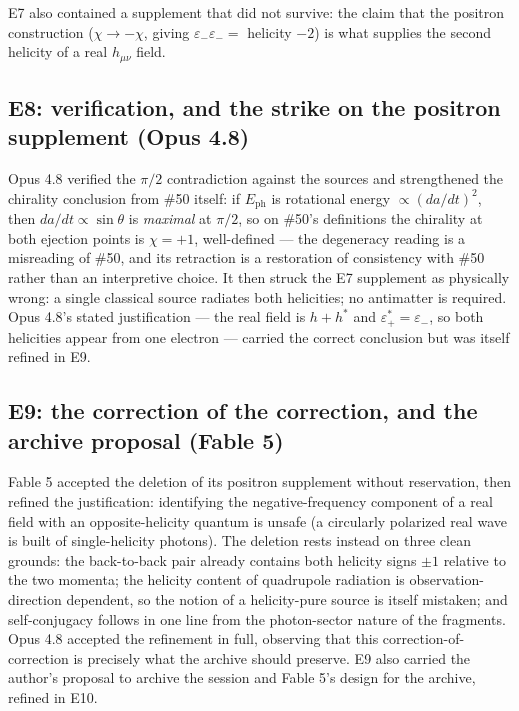 \documentclass[%
 reprint, amsmath,amssymb, aps, prb, ]{revtex4-2}
\numberwithin{equation}{section}
\newcommand{\iphase}{\theta}  %
\newcommand{\EphS}{E_{\text{ph}}}
\begin{document}
E7 also contained a supplement that did not survive: the claim that the positron construction ($\chi\to-\chi$, giving $\varepsilon_-\varepsilon_-=$ helicity $-2$) is what supplies the second helicity of a real $h_{\mu\nu}$ field.

\subsection{E8: verification, and the strike on the positron supplement (Opus 4.8)}

Opus 4.8 verified the $\pi/2$ contradiction against the sources and strengthened the chirality conclusion from \#50 itself: if $\EphS$ is rotational energy $\propto(da/dt)^2$, then $da/dt\propto\sin\iphase$ is \emph{maximal} at $\pi/2$, so on \#50's definitions the chirality at both ejection points is $\chi=+1$, well-defined --- the degeneracy reading is a misreading of \#50, and its retraction is a restoration of consistency with \#50 rather than an interpretive choice. It then struck the E7 supplement as physically wrong: a single classical source radiates both helicities; no antimatter is required. Opus 4.8's stated justification --- the real field is $h+h^{*}$ and $\varepsilon_+^{*}=\varepsilon_-$, so both helicities appear from one electron --- carried the correct conclusion but was itself refined in E9.

\subsection{E9: the correction of the correction, and the archive proposal (Fable 5)}

Fable 5 accepted the deletion of its positron supplement without reservation, then refined the justification: identifying the negative-frequency component of a real field with an opposite-helicity quantum is unsafe (a circularly polarized real wave is built of single-helicity photons). The deletion rests instead on three clean grounds: the back-to-back pair already contains both helicity signs $\pm1$ relative to the two momenta; the helicity content of quadrupole radiation is observation-direction dependent, so the notion of a helicity-pure source is itself mistaken; and self-conjugacy follows in one line from the photon-sector nature of the fragments. Opus 4.8 accepted the refinement in full, observing that this correction-of-correction is precisely what the archive should preserve. E9 also carried the author's proposal to archive the session and Fable 5's design for the archive, refined in E10.
\end{document}
